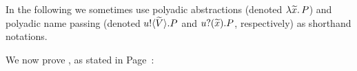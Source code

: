 
%			
%
In the following we sometimes use polyadic abstractions 
(denoted $\lambda \widetilde{x}.\,P$)
and polyadic name passing 
(denoted $u ! \langle \widetilde{V} \rangle .{P}$ and  $u ? (\widetilde{x}) .{P}$, respectively)
as shorthand notations. 








We now prove , as stated in Page~\pageref{lem:tau_inert}:


